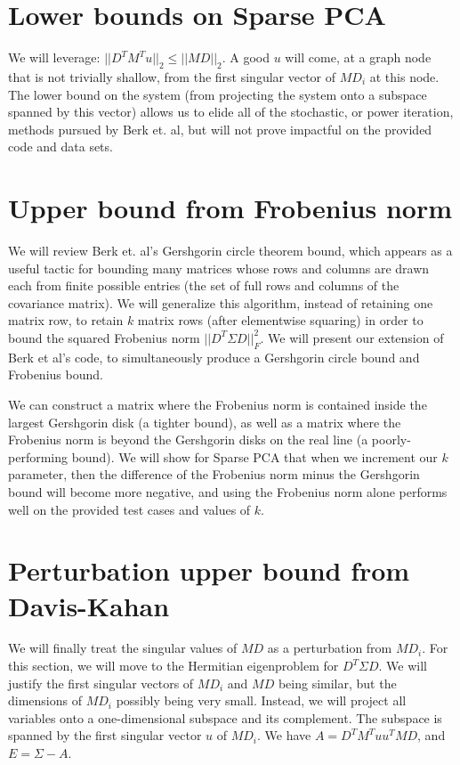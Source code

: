 \documentclass{article}
\begin{document}
\section{Lower bounds on Sparse PCA}

We will leverage: $||D^TM^Tu||_2 \le ||MD||_2$. A good $u$ will come, at a graph node that is not trivially shallow, from the first singular vector of $MD_i$ at this node. The lower bound on the system (from projecting the system onto a subspace spanned by this vector) allows us to elide all of the stochastic, or power iteration, methods pursued by Berk et. al, but will not prove impactful on the provided code and data sets.

\section{Upper bound from Frobenius norm}

We will review Berk et. al's Gershgorin circle theorem bound, which appears as a useful tactic for bounding many matrices whose rows and columns are drawn each from finite possible entries (the set of full rows and columns of the covariance matrix). We will generalize this algorithm, instead of retaining one matrix row, to retain $k$ matrix rows (after elementwise squaring) in order to bound the squared Frobenius norm $||D^T \Sigma D||_F^2$. We will present our extension of Berk et al's code, to simultaneously produce a Gershgorin circle bound and Frobenius bound.

We can construct a matrix where the Frobenius norm is contained inside the largest Gershgorin disk (a tighter bound), as well as a matrix where the Frobenius norm is beyond the Gershgorin disks on the real line (a poorly-performing bound). We will show for Sparse PCA that when we increment our $k$ parameter, then the difference of the Frobenius norm minus the Gershgorin bound will become more negative, and using the Frobenius norm alone performs well on the provided test cases and values of $k$.

\section{Perturbation upper bound from Davis-Kahan}

We will finally treat the singular values of $MD$ as a perturbation from $MD_i$. For this section, we will move to the Hermitian eigenproblem for $D^T \Sigma D$. We will justify the first singular vectors of $MD_i$ and $MD$ being similar, but the dimensions of $MD_i$ possibly being very small. Instead, we will project all variables onto a one-dimensional subspace and its complement. The subspace is spanned by the first singular vector $u$ of $MD_i$. We have $A = D^T M^T uu^T M D$, and $E = \Sigma - A$.
\end{document}
